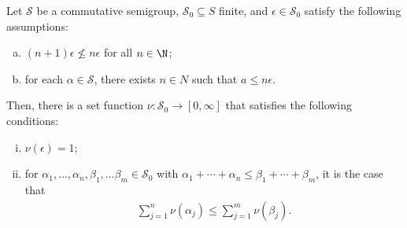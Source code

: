 \documentclass[10pt]{mypackage}
\begin{document}
  \begin{lemma}
    Let $\mathcal{S}$ be a commutative semigroup, $\mathcal{S}_0 \subseteq S$ finite, and $\epsilon \in \mathcal{S}_0$ satisfy the following assumptions:
    \begin{enumerate}[(a)]
      \item $\left(n+1\right)\epsilon \not\leq n\epsilon$ for all  $n\in \N$;
      \item for each $\alpha \in \mathcal{S}$, there exists $n\in N$ such that $a \leq n\epsilon$.
    \end{enumerate}
    Then, there is a set function $\nu: \mathcal{S}_0 \rightarrow \left[0,\infty\right]$ that satisfies the following conditions:
    \begin{enumerate}[(i)]
      \item $\nu(\epsilon) = 1$;
      \item for $\alpha_1,\dots,\alpha_n,\beta_1,\dots\beta_m\in \mathcal{S}_0$ with $\alpha_1 + \cdots + \alpha_n \leq \beta_1 + \cdots + \beta_m$, it is the case that
        \begin{align*}
          \sum_{j=1}^{n}\nu\left(\alpha_j\right) \leq \sum_{j=1}^{m}\nu\left(\beta_j\right).
        \end{align*}
    \end{enumerate}
  \end{lemma}
\end{document}
